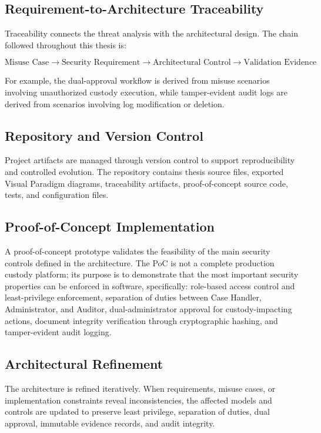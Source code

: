 \documentclass[12pt,a4paper]{report}
\begin{document}
\subsection{Requirement-to-Architecture Traceability}

Traceability connects the threat analysis with the architectural design. The chain followed throughout this thesis is:

\[
\text{Misuse Case} \rightarrow \text{Security Requirement} \rightarrow
\text{Architectural Control} \rightarrow \text{Validation Evidence}
\]

For example, the dual-approval workflow is derived from misuse scenarios involving unauthorized custody execution, while tamper-evident audit logs are derived from scenarios involving log modification or deletion.

\subsection{Repository and Version Control}

Project artifacts are managed through version control to support reproducibility and controlled evolution. The repository contains thesis source files, exported Visual Paradigm diagrams, traceability artifacts, proof-of-concept source code, tests, and configuration files.

\subsection{Proof-of-Concept Implementation}

A proof-of-concept prototype validates the feasibility of the main security controls defined in the architecture. The PoC is not a complete production custody platform; its purpose is to demonstrate that the most important security properties can be enforced in software, specifically: role-based access control and least-privilege enforcement, separation of duties between Case Handler, Administrator, and Auditor, dual-administrator approval for custody-impacting actions, document integrity verification through cryptographic hashing, and tamper-evident audit logging.

\subsection{Architectural Refinement}

The architecture is refined iteratively. When requirements, misuse cases, or implementation constraints reveal inconsistencies, the affected models and controls are updated to preserve least privilege, separation of duties, dual approval, immutable evidence records, and audit integrity.
\end{document}
